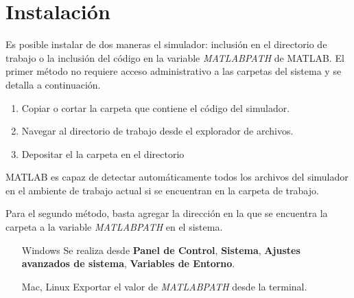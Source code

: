 \section{Instalación}

Es posible instalar de dos maneras el simulador: inclusión en el 
directorio de trabajo o la inclusión del código en 
la variable \emph{MATLABPATH} de MATLAB. El primer método no requiere acceso
administrativo a las carpetas del sistema y se detalla a continuación.

\begin{enumerate}
 \item Copiar o cortar la carpeta que contiene el código del simulador.
 \item Navegar al directorio de trabajo desde el explorador de archivos.
 \item Depositar el la carpeta en el directorio
\end{enumerate}

MATLAB es capaz de detectar automáticamente todos los archivos del simulador en 
el ambiente de trabajo actual si se encuentran en la carpeta de trabajo.

Para el segundo método, basta agregar la dirección en la que se encuentra la 
carpeta a la variable \emph{MATLABPATH} en el sistema. 

\begin{itemize}
 \item [Windows] Se realiza desde \textbf{Panel de Control}, \textbf{Sistema},
 \textbf{Ajustes avanzados de sistema}, \textbf{Variables de Entorno}.
 \item [Mac, Linux] Exportar el valor de \emph{MATLABPATH} desde la terminal.
\end{itemize}


 

